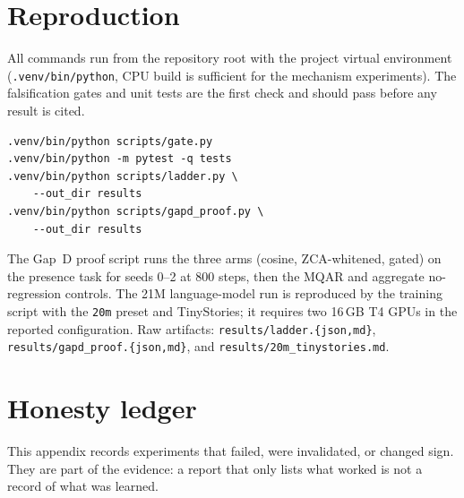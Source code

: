 \section{Reproduction}
\label{app:repro}

All commands run from the repository root with the project virtual environment
(\texttt{.venv/bin/python}, CPU build is sufficient for the mechanism experiments). The
falsification gates and unit tests are the first check and should pass before any result is
cited.

{\small
\begin{verbatim}
.venv/bin/python scripts/gate.py
.venv/bin/python -m pytest -q tests
.venv/bin/python scripts/ladder.py \
    --out_dir results
.venv/bin/python scripts/gapd_proof.py \
    --out_dir results
\end{verbatim}
}

The Gap~D proof script runs the three arms (cosine, ZCA-whitened, gated) on the presence task
for seeds 0--2 at 800 steps, then the MQAR and aggregate no-regression controls. The 21M
language-model run is reproduced by the training script with the \texttt{20m} preset and
TinyStories; it requires two 16\,GB T4 GPUs in the reported configuration. Raw artifacts:
\texttt{results/ladder.\{json,md\}}, \texttt{results/gapd\_proof.\{json,md\}}, and
\texttt{results/20m\_tinystories.md}.

\section{Honesty ledger}
\label{app:ledger}

This appendix records experiments that failed, were invalidated, or changed sign. They are part
of the evidence: a report that only lists what worked is not a record of what was learned.


